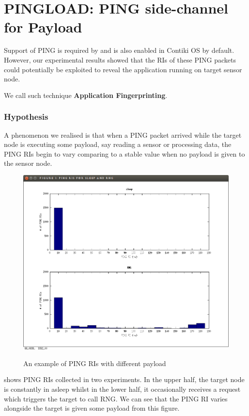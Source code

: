 \chapter{PINGLOAD: PING side-channel for Payload } \label{Chp: PINGLOAD}
Support of PING is required by \cite{rfc1122} and is also enabled in Contiki OS by default. However, our experimental results showed that the RIs of these PING packets could potentially be exploited to reveal the application running on target sensor node.

We call such technique {\bf  Application Fingerprinting}.

\subsection{Hypothesis} \label{Sec: pingload hypothesis}
A phenomenon we realised is that when a PING packet arrived while the target node is executing some payload, say reading a sensor or processing data, the PING RIs begin to vary comparing to a stable value when no payload is given to the sensor node. 

\begin{example}
\begin{figure}
\centering
{
  \includegraphics[width=1\textwidth]{fig/pingri.png}
}
\caption{An example of PING RIs with different payload}
\label{Fig: PINGLOAD RIs}
\end{figure}
 shows PING RIs collected in two experiments. In the upper half, the target node is constantly in asleep whilst in the lower half,  it occasionally receives a request which triggers the target to call RNG. We can see that the PING RI varies alongside the target is given some payload from this figure.
\end{example}

